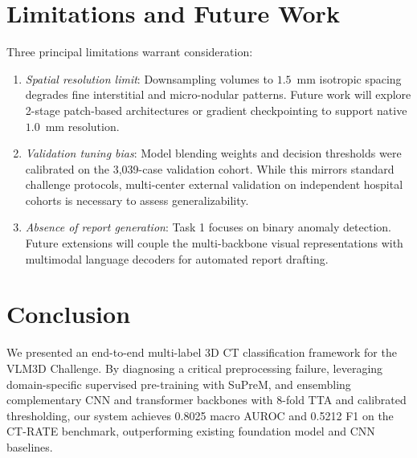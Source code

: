 \documentclass[runningheads]{llncs}
\begin{document}
\section{Limitations and Future Work}
Three principal limitations warrant consideration:
\begin{enumerate}
\setlength{\itemsep}{1pt}\setlength{\parskip}{0pt}
\item \textit{Spatial resolution limit}: Downsampling volumes to $1.5$~mm isotropic spacing degrades fine interstitial and micro-nodular patterns. Future work will explore 2-stage patch-based architectures or gradient checkpointing to support native $1.0$~mm resolution.
\item \textit{Validation tuning bias}: Model blending weights and decision thresholds were calibrated on the 3,039-case validation cohort. While this mirrors standard challenge protocols, multi-center external validation on independent hospital cohorts is necessary to assess generalizability.
\item \textit{Absence of report generation}: Task 1 focuses on binary anomaly detection. Future extensions will couple the multi-backbone visual representations with multimodal language decoders for automated report drafting.
\end{enumerate}

\section{Conclusion}
We presented an end-to-end multi-label 3D CT classification framework for the VLM3D Challenge. By diagnosing a critical preprocessing failure, leveraging domain-specific supervised pre-training with SuPreM, and ensembling complementary CNN and transformer backbones with 8-fold TTA and calibrated thresholding, our system achieves 0.8025 macro AUROC and 0.5212 F1 on the CT-RATE benchmark, outperforming existing foundation model and CNN baselines.
\end{document}
